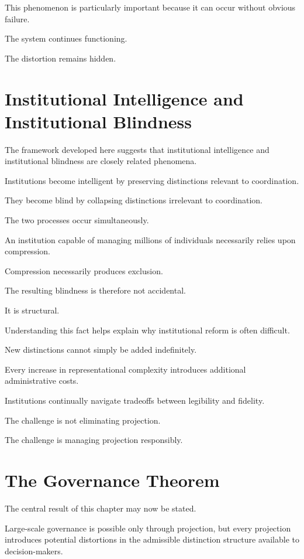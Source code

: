 \documentclass[11pt,oneside,openany]{book}
\begin{document}
This phenomenon is particularly important because it can occur without obvious failure.

The system continues functioning.

The distortion remains hidden.

\section{Institutional Intelligence and Institutional Blindness}

The framework developed here suggests that institutional intelligence and institutional blindness are closely related phenomena.

Institutions become intelligent by preserving distinctions relevant to coordination.

They become blind by collapsing distinctions irrelevant to coordination.

The two processes occur simultaneously.

An institution capable of managing millions of individuals necessarily relies upon compression.

Compression necessarily produces exclusion.

The resulting blindness is therefore not accidental.

It is structural.

Understanding this fact helps explain why institutional reform is often difficult.

New distinctions cannot simply be added indefinitely.

Every increase in representational complexity introduces additional administrative costs.

Institutions continually navigate tradeoffs between legibility and fidelity.

The challenge is not eliminating projection.

The challenge is managing projection responsibly.

\section{The Governance Theorem}

The central result of this chapter may now be stated.

\begin{theorem}

Large-scale governance is possible only through projection, but every projection introduces potential distortions in the admissible distinction structure available to decision-makers.

\end{theorem}
\end{document}
